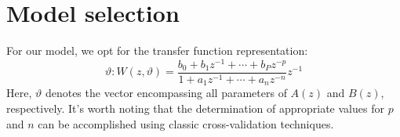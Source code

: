 \section{Model selection}

For our model, we opt for the transfer function representation:
\[\mathcal{\vartheta}:W(z,\vartheta)=\dfrac{b_0+b_1z^{-1}+\cdots+b_Pz^{-p}}{1+a_1z^{-1}+\cdots+a_nz^{-n}}z^{-1}\]
Here, $\vartheta$ denotes the vector encompassing all parameters of $A(z)$ and $B(z)$, respectively.
It's worth noting that the determination of appropriate values for $p$ and $n$ can be accomplished using classic cross-validation techniques.